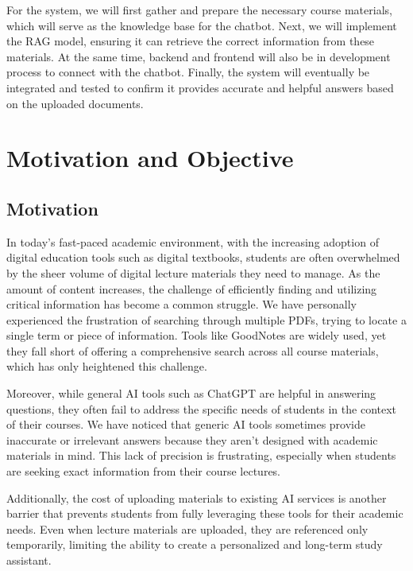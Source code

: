 \documentclass[runningheads]{llncs}
\begin{document}
\begin{spacing}{1.25}
For the system, we will first gather and prepare the necessary course materials, which will serve as the knowledge base for the chatbot. Next, we will implement the RAG model, ensuring it can retrieve the correct information from these materials. At the same time, backend and frontend will also be in development process to connect with the chatbot. Finally, the system will eventually be integrated and tested to confirm it provides accurate and helpful answers based on the uploaded documents.


\section{Motivation and Objective}

\subsection{Motivation}
In today’s fast-paced academic environment, with the increasing adoption of digital education tools such as digital textbooks, students are often overwhelmed by the sheer volume of digital lecture materials they need to manage. As the amount of content increases, the challenge of efficiently finding and utilizing critical information has become a common struggle. We have personally experienced the frustration of searching through multiple PDFs, trying to locate a single term or piece of information. Tools like GoodNotes are widely used, yet they fall short of offering a comprehensive search across all course materials, which has only heightened this challenge.

Moreover, while general AI tools such as ChatGPT are helpful in answering questions, they often fail to address the specific needs of students in the context of their courses. We have noticed that generic AI tools sometimes provide inaccurate or irrelevant answers because they aren’t designed with academic materials in mind. This lack of precision is frustrating, especially when students are seeking exact information from their course lectures.

Additionally, the cost of uploading materials to existing AI services is another barrier that prevents students from fully leveraging these tools for their academic needs. Even when lecture materials are uploaded, they are referenced only temporarily, limiting the ability to create a personalized and long-term study assistant.


\end{spacing}
\end{document}
